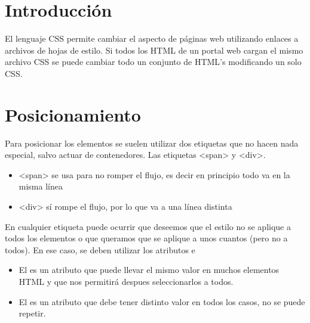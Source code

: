 \documentclass[letterpaper,10pt,spanish]{sphinxmanual}
\begin{document}
\section{Introducción}
\label{tema3:introduccion}
El lenguaje CSS permite cambiar el aspecto de páginas web utilizando enlaces a archivos de hojas de estilo. Si todos los HTML de un portal web cargan el mismo archivo CSS se puede cambiar todo un conjunto de HTML's modificando un solo CSS.


\section{Posicionamiento}
\label{tema3:posicionamiento}
Para posicionar los elementos se suelen utilizar dos etiquetas que no hacen nada especial, salvo actuar de contenedores. Las etiquetas \textless{}span\textgreater{} y \textless{}div\textgreater{}.
\begin{itemize}
\item {} 
\textless{}span\textgreater{} se usa para no romper el flujo, es decir en principio todo va en la misma línea

\item {} 
\textless{}div\textgreater{} sí rompe el flujo, por lo que va a una línea distinta

\end{itemize}

En cualquier etiqueta puede ocurrir que deseemos que el estilo no se aplique a todos los elementos o que queramos que se aplique a unos cuantos (pero no a todos). En ese caso, se deben utilizar los atributos  e 
\begin{itemize}
\item {} 
El  es un atributo que puede llevar el mismo valor en muchos elementos HTML y que nos permitirá despues seleccionarlos a todos.

\item {} 
El  es un atributo que debe tener distinto valor en todos los casos, no se puede repetir.

\end{itemize}
\end{document}
